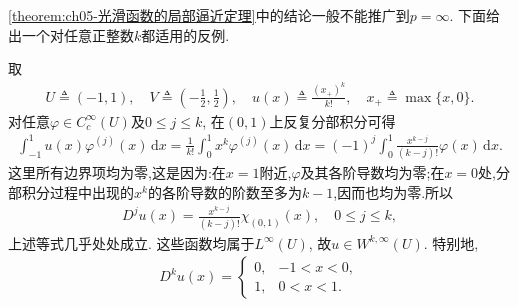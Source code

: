 \documentclass[../../main.tex]{subfiles}
\begin{document}
\begin{remark}
\cref{theorem:ch05-光滑函数的局部逼近定理}中的结论一般不能推广到$p=\infty$. 下面给出一个对任意正整数$k$都适用的反例.

取
\begin{align*}
U\triangleq(-1,1),\quad V\triangleq\left(-\frac12,\frac12\right),\quad
u(x)\triangleq\frac{(x_+)^k}{k!},\quad x_+\triangleq\max\{x,0\}.
\end{align*}
对任意$\varphi\in C_c^\infty(U)$及$0\leqslant j\leqslant k$, 在$(0,1)$上反复分部积分可得
\begin{align*}
\int_{-1}^{1}u(x)\varphi^{(j)}(x)\,\mathrm{d}x
=\frac{1}{k!}\int_0^1x^k\varphi^{(j)}(x)\,\mathrm{d}x
=(-1)^j\int_0^1\frac{x^{k-j}}{(k-j)!}\varphi(x)\,\mathrm{d}x.
\end{align*}
这里所有边界项均为零,这是因为:在$x=1$附近,$\varphi$及其各阶导数均为零;在$x=0$处,分部积分过程中出现的$x^k$的各阶导数的阶数至多为$k-1$,因而也均为零.所以
\begin{align*}
D^ju(x)=\frac{x^{k-j}}{(k-j)!}\chi_{(0,1)}(x),\quad 0\leqslant j\leqslant k,
\end{align*}
上述等式几乎处处成立. 这些函数均属于$L^\infty(U)$, 故$u\in W^{k,\infty}(U)$. 特别地,
\begin{align*}
D^ku(x)=
\begin{cases}
0,&-1<x<0,\\
1,&0<x<1.
\end{cases}
\end{align*}


\end{remark}
\end{document}
